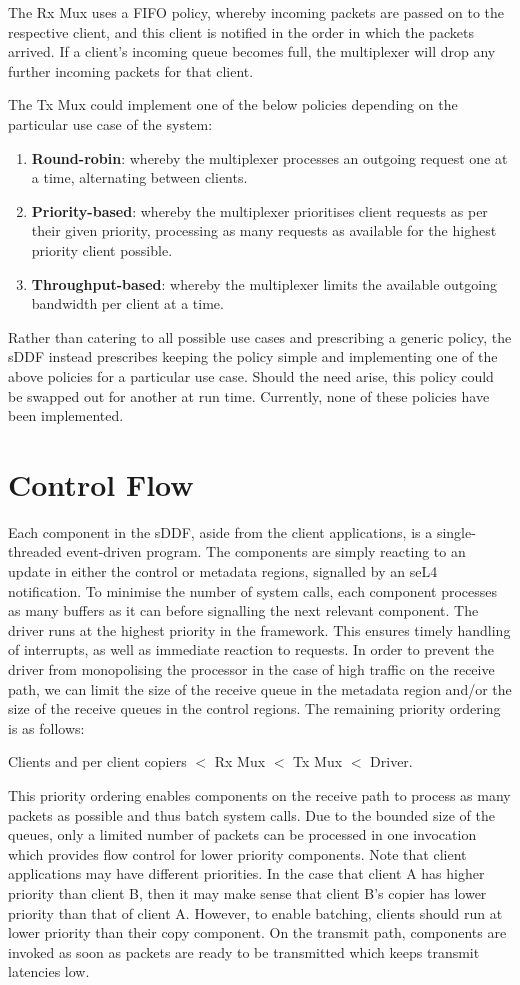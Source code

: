 The Rx Mux uses a FIFO policy, whereby incoming packets are passed on to the respective client, and this client is notified in the 
order in which the packets arrived. If a client's incoming queue becomes full, the multiplexer will drop any further
incoming packets for that client.

The Tx Mux could implement one of the below policies depending on the particular use case of the system:
\begin{enumerate}
\item \textbf{Round-robin}: whereby the multiplexer processes an outgoing request one at a time, alternating between clients.
\item \textbf{Priority-based}: whereby the multiplexer prioritises client requests as per their given priority, processing as many
requests as available for the highest priority client possible. 
\item \textbf{Throughput-based}: whereby the multiplexer limits the available outgoing bandwidth per client at a time.
\end{enumerate}
Rather than catering to all possible use cases and prescribing a generic policy, the sDDF instead prescribes 
keeping the policy simple and implementing one of the above policies for 
a particular use case. Should the need arise, this policy could be swapped out for another at run time. Currently,
none of these policies have been implemented.

\section{Control Flow}
Each component in the sDDF, aside from the client applications, is a single-threaded event-driven program. The
components are simply reacting to an update in either the control or metadata regions, signalled by an seL4 notification. 
To minimise the number of system calls, each component processes as many buffers as it can before signalling the next
relevant component.
The driver runs at the highest priority in the framework. This ensures timely handling of interrupts, as well
as immediate reaction to requests. In order to prevent the driver from monopolising the processor in the case
of high traffic on the receive path, we can limit the size of the receive queue in the metadata region and/or 
the size of the receive queues in the control regions.
The remaining priority ordering is as follows:

\centerline{Clients and per client copiers \(<\) Rx Mux \(<\) Tx Mux \(<\) Driver.}

This priority ordering enables components on the receive path to process as many packets as possible and
thus batch system calls. Due to the bounded size of the queues, only a limited number of packets 
can be processed in one invocation which provides flow control for lower priority components. Note that
client applications may have different priorities. In the case that client A has higher priority
than client B, then it may make sense that client B's copier has lower priority than that of client A.
However, to enable batching, clients should run at lower priority than their copy component. 
On the transmit path, components are invoked as soon as packets are 
ready to be transmitted which keeps transmit latencies low.
